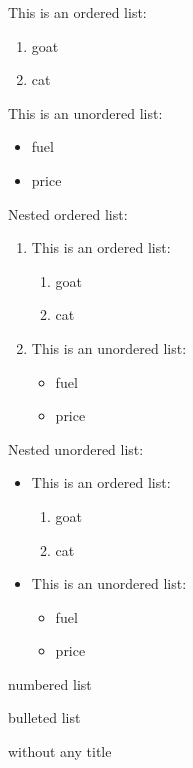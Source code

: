 \documentclass{article}
\begin{document}
This is an ordered list:
\begin{enumerate}
\item goat
\item cat
\end{enumerate}

\noindent This is an unordered list:
\begin{itemize}
\item fuel
\item price
\end{itemize}

\noindent Nested ordered list:
\begin{enumerate}
	\item This is an ordered list:
	\begin{enumerate}
	\item goat
	\item cat
	\end{enumerate}
	
	\item This is an unordered list:
	\begin{itemize}
	\item fuel
	\item price
	\end{itemize}
\end{enumerate}

\noindent Nested unordered list:
\begin{itemize}
	\item This is an ordered list:
	\begin{enumerate}
	\item goat
	\item cat
	\end{enumerate}
	
	\item This is an unordered list:
	\begin{itemize}
	\item fuel
	\item price
	\end{itemize}
\end{itemize}

\begin{description}
	\item[ordered list] numbered list
	\item[unordered list] bulleted list
	\item without any title
\end{description}
\end{document}
